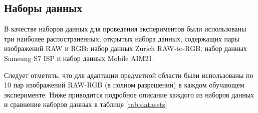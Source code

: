 \subsection{Наборы данных}\label{sect-5-2}

В качестве наборов данных для проведения экспериментов были использованы три наиболее распостраненных, открытых набора данных, содержащих пары изображений RAW и RGB: набор данных Zurich RAW-to-RGB, набор данных Samsung S7 ISP и набор данных Mobile AIM21.

Следует отметить, что для адаптации предметной области были использованы по 10 пар изображений RAW-RGB (в полном разрешении) в каждом обучающем эксперименте. Ниже приводится подробное описание каждого из наборов данных и сравнение наборов данных в таблице \ref{tab:datasets}.





